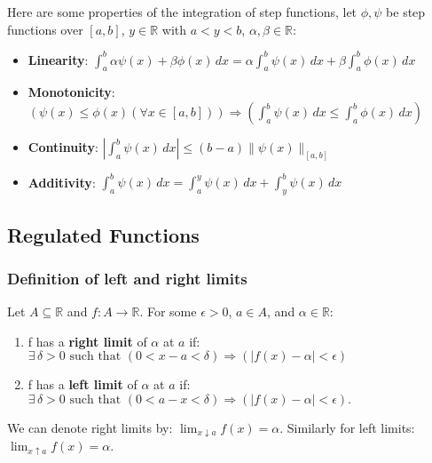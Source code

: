 \documentclass[a4paper, 12pt, twoside]{article}
\begin{document}
Here are some properties of the integration of step functions, let
$\phi, \psi$ be step functions over $[a, b]$, $y \in \mathbb{R}$
with $a < y < b$, $\alpha, \beta \in \mathbb{R}$:

\begin{itemize}
      \item \textbf{Linearity}: $\int_a^b \alpha \psi(x) + \beta \phi(x)
                  \, dx = \alpha \int_a^b \psi(x) \, dx + \beta \int_a^b
                  \phi(x) \, dx$
      \item \textbf{Monotonicity}: $(\psi(x) \leq \phi(x) (\forall
                  x \in [a, b])) \Rightarrow (\int_a^b \psi(x) \, dx
                  \leq \int_a^b \phi(x) \, dx)$
      \item \textbf{Continuity}: $|\int_a^b \psi(x) \, dx| \leq (b-a)
                  \|\psi(x)\|_{[a, b]}$
      \item \textbf{Additivity}: $\int_a^b \psi(x) \, dx = \int_a^y
                  \psi(x) \, dx + \int_y^b \psi(x) \, dx$
\end{itemize}

\newpage

\subsection{Regulated Functions}

\subsubsection{Definition of left and right limits}

Let $A \subseteq \mathbb{R}$ and $f:A\to\mathbb{R}$. For some $\epsilon > 0$,
$a \in A$, and  $\alpha \in \mathbb{R}$:

\begin{enumerate}
      \item f has a \textbf{right limit} of $\alpha$ at $a$ if: \\
            $\exists\,\delta > 0 \text{ such that } (0 < x - a < \delta)
                  \Rightarrow (|f(x) - \alpha| < \epsilon)$
      \item f has a \textbf{left limit} of $\alpha$ at $a$ if: \\
            $\exists\,\delta > 0 \text{ such that } (0 < a - x < \delta)
                  \Rightarrow (|f(x) - \alpha| < \epsilon).$
\end{enumerate}

We can denote right limits by: $\lim_{x\downarrow a}f(x) = \alpha$.
Similarly for left limits: $\lim_{x\uparrow a}f(x) = \alpha$.
\end{document}

